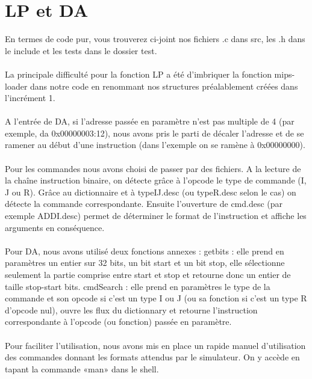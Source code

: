 \documentclass[10pt,a4paper]{report}
\begin{document}
\section{LP et DA}

En termes de code pur, vous trouverez ci-joint nos fichiers .c dans src, les .h dans le include et les tests dans le dossier test.
\paragraph{}
	La principale difficulté pour la fonction LP a été d’imbriquer la fonction mips-loader dans notre code en renommant nos structures préalablement créées dans l’incrément 1.
\paragraph{}
	A l’entrée de DA, si l’adresse passée en paramètre n’est pas multiple de 4 (par exemple, da 0x00000003:12), nous avons pris le parti de décaler l’adresse et de se ramener au début d’une instruction (dans l’exemple on se ramène à 0x00000000).
\paragraph{}
Pour les commandes nous avons choisi de passer par des fichiers. A la lecture de la chaîne instruction binaire, on détecte grâce à l’opcode le type de commande (I, J ou R). Grâce au dictionnaire et à typeIJ.desc (ou typeR.desc selon le cas) on détecte la commande correspondante. Ensuite l’ouverture de cmd.desc (par exemple ADDI.desc) permet de déterminer le format de l’instruction et affiche les arguments en conséquence.
\paragraph{}
Pour DA, nous avons utilisé deux fonctions annexes :\newline
getbits : elle prend en paramètres un entier sur 32 bits, un bit start et un bit stop, elle sélectionne seulement la partie comprise entre start et stop et retourne donc un entier de taille stop-start bits.
\newline	
cmdSearch : elle prend en paramètres le type de la commande et son opcode si c’est un type I ou J (ou sa fonction si c’est un type R d’opcode nul), ouvre les flux du dictionnary et retourne l’instruction correspondante à l’opcode (ou fonction) passée en paramètre.
\paragraph{}
	Pour faciliter l'utilisation, nous avons mis en place un rapide manuel d'utilisation des commandes donnant les formats attendus par le simulateur. On y accède en tapant la commande «man» dans le shell.
\end{document}
